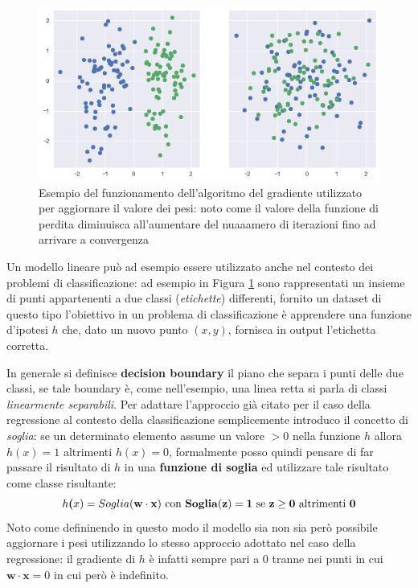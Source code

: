 \documentclass[../../main.tex]{subfiles}
\begin{document}
    \begin{figure}[H]
        \centering
        \includegraphics[scale = 0.6]{immagini/4_1/classification_datasets.png}
        \caption{Esempio del funzionamento dell'algoritmo del gradiente utilizzato per aggiornare il valore dei pesi: noto come il valore della funzione di perdita diminuisca all'aumentare del nuaaamero di iterazioni fino ad arrivare a convergenza}
        \label{fig:classification_datasets}
    \end{figure}

    Un modello lineare può ad esempio essere utilizzato anche nel contesto dei problemi di classificazione: ad esempio in Figura \ref{fig:classification_datasets} sono rappresentati un insieme di punti appartenenti a due classi (\textit{etichette}) differenti, fornito un dataset di questo tipo l'obiettivo in un problema di classificazione è apprendere una funzione d'ipotesi $h$ che, dato un nuovo punto $(x, y)$, fornisca in output l'etichetta corretta.
    
    In generale si definisce \textbf{decision boundary} il piano che separa i punti delle due classi, se tale boundary è, come nell'esempio, una linea retta si parla di classi \textit{linearmente separabili}. Per adattare l'approccio già citato per il caso della regressione al contesto della classificazione semplicemente introduco il concetto di \textit{soglia}: se un determinato elemento assume un valore $> 0$ nella funzione $h$ allora $h(x) = 1$ altrimenti $h(x) = 0$, formalmente posso quindi pensare di far passare il risultato di $h$ in una \textbf{funzione di soglia} ed utilizzare tale risultato come classe risultante:
    \[h\boldsymbol(x) = Soglia(\bf{w} \cdot \bf{x}) \ \text{con} \ Soglia(z) = 1 \ \text{se} \ z \geq 0 \ \text{altrimenti} \ 0\]
    Noto come defininendo in questo modo il modello sia non sia però possibile aggiornare i pesi utilizzando lo stesso approccio adottato nel caso della regressione: il gradiente di $h$ è infatti sempre pari a 0 tranne nei punti in cui $\boldsymbol{w} \cdot \boldsymbol{x} = 0$ in cui però è indefinito.
    
\end{document}
